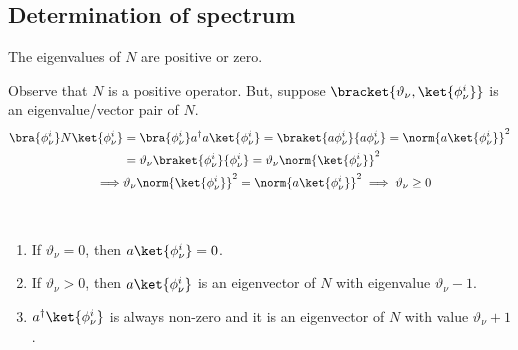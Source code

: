 \subsection{Determination of spectrum}
\begin{lemma}
    The eigenvalues of \(N\) are positive or zero.
\end{lemma}
\begin{prooflemma}
    Observe that \(N\) is a positive operator. But, suppose \(\bracket{\vartheta_{\nu}, \ket{\phi_{\nu}^i}}\) is an eigenvalue/vector pair of \(N\).
    \begin{align*}
        \bra{\phi_{\nu}^i} N \ket{\phi_{\nu}^i} & = \bra{\phi_{\nu}^i} a^{\dagger} a \ket{\phi_{\nu}^i} = \braket{a \phi_{\nu}^i }{a \phi_{\nu}^i} = \norm{a \ket{\phi_{\nu}^i}}^2 \\
                                                & =  \vartheta_{\nu} \braket{\phi_{\nu}^i }{\phi_{\nu}^i} = \vartheta_{\nu} \norm{\ket{\phi_{\nu}^i}}^2                            \\
        \implies                                & \vartheta_{\nu} \norm{\ket{\phi_{\nu}^i}}^2 = \norm{a \ket{\phi_{\nu}^i}}^2 \implies \vartheta_{\nu} \geq 0
    \end{align*}
\end{prooflemma}

\begin{lemma}
    \
    \begin{enumerate}
        \item If \(\vartheta_{\nu} = 0\), then \(a \ket{\phi_{\nu}^i} = 0\).
        \item If \(\vartheta_{\nu} > 0\),  then \(a \ket{\phi_{\nu}^i}\) is an eigenvector of \(N\) with eigenvalue \(\vartheta_{\nu} - 1\).
        \item \(a^{\dagger} \ket{\phi_{\nu}^i}\) is always non-zero and it is an eigenvector of \(N\) with value \(\vartheta_{\nu} + 1\).
    \end{enumerate}
\end{lemma}

